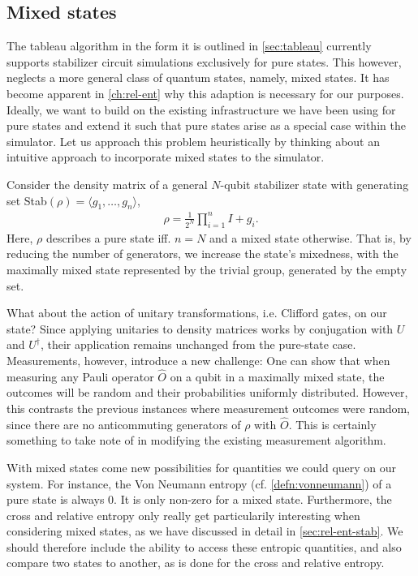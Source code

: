\subsection{Mixed states}\label{sec:mixed-states}
The tableau algorithm in the form it is outlined in \cref{sec:tableau}
currently supports stabilizer circuit simulations exclusively for pure states.
This however,
neglects a more general class of quantum states, namely, mixed states. It has
become apparent in \cref{ch:rel-ent} why this adaption is necessary for our
purposes. Ideally, we want to build on the existing infrastructure we have been
using for pure states and extend it such that pure states arise as a special
case within the simulator. 
Let us approach this problem
heuristically by thinking about an intuitive approach to incorporate mixed
states to the simulator.

Consider the density matrix of a general $N$-qubit stabilizer
state with generating set Stab$\left( \rho \right) = \langle g_1, \ldots, g_n
\rangle$,
\begin{align}
  \rho = \frac{1}{2^N} \prod_{i=1}^n I + g_i
.\end{align}
Here, $\rho$ describes a pure state iff. $n=N$ and a mixed state otherwise.
That is, by reducing the number of generators, we increase the state's
mixedness, with the maximally mixed state represented by the trivial group,
generated by the empty set.

What about the action of unitary transformations, i.e. Clifford gates, on our
state? Since applying unitaries to density matrices works by conjugation with
$U$ and $U^\dagger$, their application remains unchanged from the pure-state
case. Measurements, however, introduce a new challenge:
One can show that when measuring any
Pauli operator $\hat{O}$ on a qubit in a maximally mixed state, the outcomes
will be random and their probabilities uniformly distributed. However, this
contrasts the previous instances where measurement outcomes were random, since
there are no anticommuting generators of $\rho$ with $\hat{O}$. This is
certainly something to take note of in modifying the existing measurement
algorithm.

With mixed states come new possibilities for quantities we could query on our
system. For instance, the Von Neumann entropy (cf. \cref{defn:vonneumann}) of a
pure state is always $0$. It is only non-zero for a mixed state.
Furthermore, the cross and relative entropy only
really get particularily interesting when considering mixed states, as we have
discussed in detail in \cref{sec:rel-ent-stab}. We should therefore include the
ability to access these entropic quantities, and also compare two states to
another, as is done for the cross and relative entropy.

